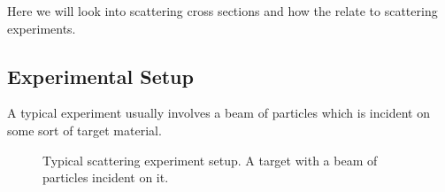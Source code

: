 Here we will look into scattering cross sections and how the relate to scattering experiments.

\subsection{Experimental Setup}
A typical experiment usually involves a beam of particles which is incident on some sort of target material.

\begin{figure}[h]
  \centering

\caption{Typical scattering experiment setup. A target with a beam of particles incident on it.} \label{fig:semiMajor}
\end{figure}
